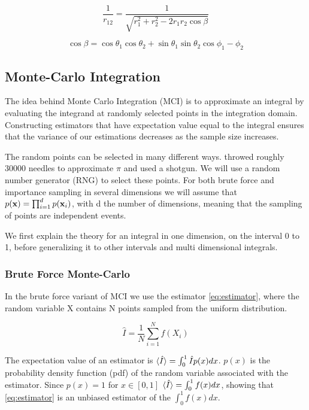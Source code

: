 \begin{equation}
  \label{eq:distance_spherical}
  \frac{1}{r_{12}} = \frac{1}{\sqrt{r_1^2 + r_2^2 - 2r_1r_2 \cos{\beta}}}
\end{equation}

\begin{equation}
  \label{eq:cos_beta}
  \cos{\beta} = \cos{\theta_1} \cos{\theta_2} + \sin{\theta_1} \sin{\theta_2}
  \cos{\phi_1 -\phi_2}
\end{equation}

\subsection{Monte-Carlo Integration}

The idea behind Monte Carlo Integration (MCI) is to approximate an integral by
evaluating the integrand at randomly selected points in the integration domain.
Constructing estimators that have expectation value equal to the integral
ensures that the variance of our estimations decreases as the sample size increases.

The random points can be selected in many different ways. \cite{needle} throwed
roughly 30000 needles to approximate $\pi$ and \cite{shotgun} used a shotgun.
We will use a random number generator (RNG) to select these points.
For both brute force and importance sampling in several dimensions we will
assume that $p(\mathbf{x}) = \prod_{i=1}^{d} p(\mathbf{x}_i)$, with d the number of dimensions,
meaning that the sampling of points are independent events.

We first explain the theory for an integral in one dimension, on the interval 0 to 1,
before generalizing it to other intervals and multi dimensional integrals.

\subsubsection{Brute Force Monte-Carlo}

In the brute force variant of MCI we use the estimator \cref{eq:estimator},
where the random variable X contains N points sampled from the uniform distribution.

\begin{equation}
  \label{eq:estimator}
  \hat{I} = \frac{1}{N}\sum_{i=1}^{N} f(X_i)
\end{equation}

The expectation value of an estimator is $\braket{\hat{I}} = \int_{0}^{1}
\hat{I}p(x)dx$. $p(x)$ is the probability density function (pdf) of the random
variable associated with the estimator. Since $p(x) = 1 $ for $x \in [0,1]$
$\braket{\hat{I}} = \int_0^1 f(x) dx $, showing that \cref{eq:estimator} is an
unbiased estimator of the $\int_0^1 f(x) dx$.


